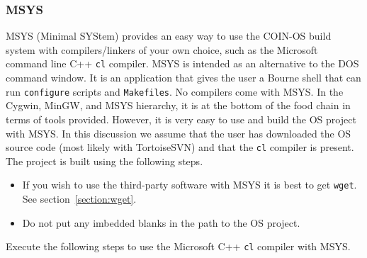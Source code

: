 \documentclass[11pt]{article}
\renewcommand{\_}{{\char"5F}}
\renewcommand{\{}{{\char"7B}}
\renewcommand{\}}{{\char"7D}}
\renewcommand{\^}{{\char"0D}}
\renewcommand{\'}{{\char"0D}}
\begin{document}
\subsubsection{MSYS} \label{section:msys}

%
MSYS (Minimal SYStem) provides an easy way to use the COIN-OS build system with compilers/linkers of your own choice,
such as the Microsoft command line C++ {\tt cl} compiler.  MSYS is intended as an alternative to the DOS command window.
It is an application that gives the user a Bourne shell that can run {\tt configure}  scripts and {\tt Makefiles}.  
No compilers come with MSYS. 
In the Cygwin, MinGW, and MSYS hierarchy, it is at the bottom of the food chain in terms of tools provided. 
However, it is very easy to use and build the OS project with MSYS.    In this discussion we assume that the user 
has downloaded the OS source code (most likely  with TortoiseSVN) and that the {\tt cl} compiler is present.  
The project is built using the following steps.

\vskip 8pt


\begin{itemize}

\item If you wish to use the third-party software with MSYS it is best to get {\tt wget}.
See section~\ref{section:wget}.

 \item Do not put any imbedded blanks in the path to the OS project.
\end{itemize}



Execute the following steps to use the Microsoft C++ {\tt cl} compiler with MSYS.
\end{document}
